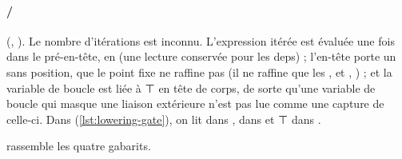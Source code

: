 \paragraph{ / } (, ). Le nombre d'itérations est inconnu. L'expression itérée est évaluée une fois dans le pré-en-tête, en  (une lecture conservée pour les deps) ; l'en-tête porte un  sans position, que le point fixe ne raffine pas (il ne raffine que les ,  et , ) ; et la variable de boucle est liée à ⊤ en tête de corps, de sorte qu'une variable de boucle qui masque une liaison extérieure n'est pas lue comme une capture de celle-ci. Dans  (\cref{lst:lowering-gate}), on lit  dans ,  dans  et ⊤ dans .

 rassemble les quatre gabarits.

